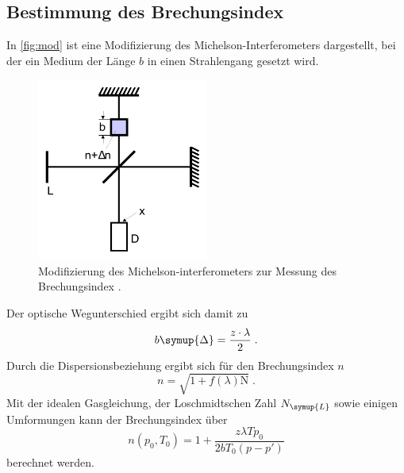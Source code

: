 \subsection{Bestimmung des Brechungsindex}
In \autoref{fig:mod} ist eine Modifizierung des Michelson-Interferometers dargestellt, bei der ein Medium der Länge $b$ in einen Strahlengang 
gesetzt wird.
\begin{figure}
    \centering
    \includegraphics[height = 6cm]{modbrech.pdf}
    \caption{Modifizierung des Michelson-interferometers zur Messung des Brechungsindex \cite{ap401}.}
    \label{fig:mod}
\end{figure}
Der optische Wegunterschied ergibt sich damit zu 
\begin{equation*}
    b\symup{\Delta} = \frac{z\cdot\lambda}{2} \; . 
\end{equation*}
Durch die Dispersionsbeziehung ergibt sich für den Brechungsindex $n$
\begin{equation*}
    n = \sqrt{1+f\left(\lambda\right)\text{N}} \; .
\end{equation*}
Mit der idealen Gasgleichung, der Loschmidtschen Zahl $N_{\symup{L}}$ sowie einigen Umformungen kann der Brechungsindex über
\begin{equation*}
    n\left(p_0, T_0\right) = 1 + \frac{z\lambda T p_0}{2bT_0\left(p-p'\right)}
\end{equation*}
berechnet werden. 